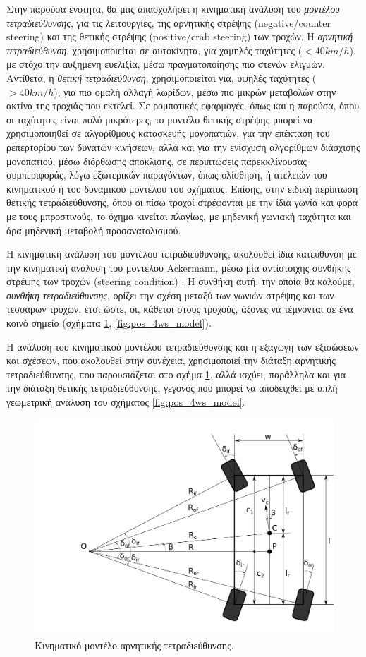 {\bigskip
Στην παρούσα ενότητα, θα μας απασχολήσει η κινηματική ανάλυση του \textit{μοντέλου τετραδιεύθυνσης}, για τις λειτουργίες, της {αρνητικής στρέψης (negative/counter steering)} και της {θετικής στρέψης (positive/crab steering)} των τροχών. Η \textit{αρνητική τετραδιεύθυνση}, χρησιμοποιείται σε αυτοκίνητα, για χαμηλές ταχύτητες ($< 40 km/h$), με στόχο την αυξημένη ευελιξία, μέσω πραγματοποίησης πιο στενών ελιγμών. Αντίθετα, η \textit{θετική τετραδιεύθυνση}, χρησιμοποιείται για, υψηλές ταχύτητες ($> 40 km/h$), για πιο ομαλή αλλαγή λωρίδων, μέσω πιο μικρών μεταβολών στην ακτίνα της τροχιάς που εκτελεί. Σε ρομποτικές εφαρμογές, όπως και η παρούσα, όπου οι ταχύτητες είναι πολύ μικρότερες, το μοντέλο θετικής στρέψης μπορεί να χρησιμοποιηθεί σε αλγορίθμους κατασκευής μονοπατιών, για την επέκταση του ρεπερτορίου των δυνατών κινήσεων, αλλά και για την ενίσχυση αλγορίθμων διάσχισης μονοπατιού, μέσω διόρθωσης απόκλισης, σε περιπτώσεις παρεκκλίνουσας συμπεριφοράς, λόγω εξωτερικών παραγόντων, όπως ολίσθηση, ή ατελειών του κινηματικού ή του δυναμικού μοντέλου του οχήματος. Επίσης, στην ειδική περίπτωση {θετικής τετραδιεύθυνσης}, όπου οι πίσω τροχοί στρέφονται με την ίδια γωνία και φορά με τους μπροστινούς, το όχημα κινείται πλαγίως, με μηδενική γωνιακή ταχύτητα και άρα μηδενική μεταβολή προσανατολισμού.


\bigskip
Η κινηματική ανάλυση του {μοντέλου τετραδιεύθυνσης}, ακολουθεί ίδια κατεύθυνση με την κινηματική ανάλυση του {μοντέλου Ackermann}, μέσω μία αντίστοιχης συνθήκης στρέψης των τροχών (steering condition) \cite{vehicle_dynamics}. Η συνθήκη αυτή, την οποία θα καλούμε, \textit{συνθήκη τετραδιεύθυνσης}, ορίζει την σχέση μεταξύ των γωνιών στρέψης και των τεσσάρων τροχών, έτσι ώστε, οι, κάθετοι στους τροχούς, άξονες να τέμνονται σε ένα κοινό σημείο (σχήματα \ref{fig:4ws_model}, \ref{fig:pos_4ws_model}). 

\bigskip
Η ανάλυση του {κινηματικού μοντέλου τετραδιεύθυνσης} και η εξαγωγή των εξισώσεων και σχέσεων, που ακολουθεί στην συνέχεια, χρησιμοποιεί την διάταξη {αρνητικής τετραδιεύθυνσης}, που παρουσιάζεται στο σχήμα \ref{fig:4ws_model}, αλλά ισχύει, παράλληλα και για την διάταξη {θετικής τετραδιεύθυνσης}, γεγονός που μπορεί να αποδειχθεί με απλή γεωμετρική ανάλυση του σχήματος \ref{fig:pos_4ws_model}.

\begin{figure}[!ht]
	\centering
	\includegraphics[width=0.7\linewidth]{Chapters/Chapter2/Figures/4ws_model.png}
	\caption{Κινηματικό μοντέλο αρνητικής τετραδιεύθυνσης.}
	\label{fig:4ws_model}
\end{figure}

}
